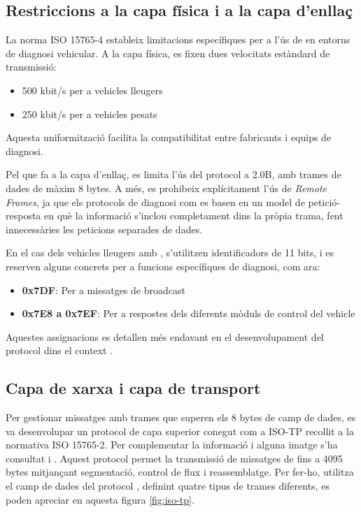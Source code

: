 \documentclass{tfgitic}[2024/07/01]
\begin{document}
\subsection{Restriccions a la capa física i a la capa d'enllaç}

La norma ISO 15765-4 estableix limitacions específiques per a l'ús de  en entorns de diagnosi vehicular. A la capa física, es fixen dues velocitats estàndard 
de transmissió:

\begin{itemize}
  \item 500 kbit/s per a vehicles lleugers
  
  \item 250 kbit/s per a vehicles pesats
\end{itemize} 

Aquesta uniformització facilita la compatibilitat entre fabricants i equips de diagnosi.

Pel que fa a la capa d'enllaç, es limita l'ús del protocol a  2.0B, amb trames de dades de màxim 8 bytes. A més, es prohibeix explícitament l'ús de \textit{Remote Frames}, 
ja que els protocols de diagnosi com  es basen en un model de petició-resposta en què la informació s'inclou completament dins la pròpia trama, fent innecessàries 
les peticions separades de dades.

En el cas dels vehicles lleugers amb , s'utilitzen identificadors de 11 bits, i es reserven alguns  concrets per a funcions específiques de diagnosi, com ara:

\begin{itemize}
  \item \textbf{0x7DF}: Per a missatges de broadcast
  
  \item \textbf{0x7E8 a 0x7EF}: Per a respostes dels diferents mòduls de control del vehicle
\end{itemize} 

Aquestes assignacions es detallen més endavant en el desenvolupament del protocol dins el context .

\subsection{Capa de xarxa i capa de transport}

Per gestionar missatges amb trames que superen els 8 bytes de camp de dades, es va desenvolupar un protocol de capa superior conegut com a ISO-TP recollit a 
la normativa ISO 15765-2. Per complementar la informació i alguna imatge s'ha consultat \cite{wikipedia_isotp} i \cite{emotive_isotp}. Aquest protocol permet la transmissió de missatges de fins a 
4095 bytes mitjançant segmentació, control de flux i reassemblatge. Per fer-ho, utilitza el camp de dades del protocol , definint quatre tipus de trames diferents, 
es poden apreciar en aquesta figura \ref{fig:iso-tp}.
\end{document}
